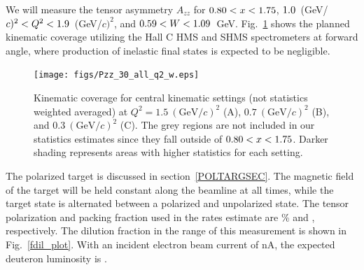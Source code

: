 




\label{EXP}
We will measure the tensor asymmetry $A_{zz}$ for $0.80<x<1.75$, $1.0$~(GeV/$c)^2 < Q^2 <1.9$~(GeV/$c)^2$, and $0.59 < W < 1.09$~GeV. Fig.~\ref{kincov} shows the planned kinematic coverage utilizing the Hall C HMS and SHMS spectrometers at forward angle, where production of inelastic final states is expected to be negligible. 

\begin{figure}
\begin{center}
\texttt{[image: figs/Pzz\_30\_all\_q2\_w.eps]}

\caption{\label{kincov} Kinematic coverage for central kinematic settings (not statistics weighted averaged) at $Q^2=1.5~(\mathrm{GeV}/c)^2$ (A), $0.7~(\mathrm{GeV}/c)^2$ (B), and $0.3~(\mathrm{GeV}/c)^2$ (C).  The grey regions are not included in our statistics estimates since they fall outside of $0.80 < x < 1.75$. Darker shading represents areas with higher statistics for each setting.}
\end{center}
\end{figure}


The polarized \TARGET target is discussed in section~\ref{POLTARGSEC}.  The magnetic field of the target will be held constant along the beamline at all times, while the target state is alternated between a polarized and unpolarized state.
The tensor polarization and packing fraction used in the rates estimate are \PZZ\% and \PF, respectively. 
The dilution fraction in the range of this measurement is shown in Fig.~\ref{fdil_plot}.
With an incident electron beam current of \CURRENT nA, the expected deuteron luminosity is \LUMI.

